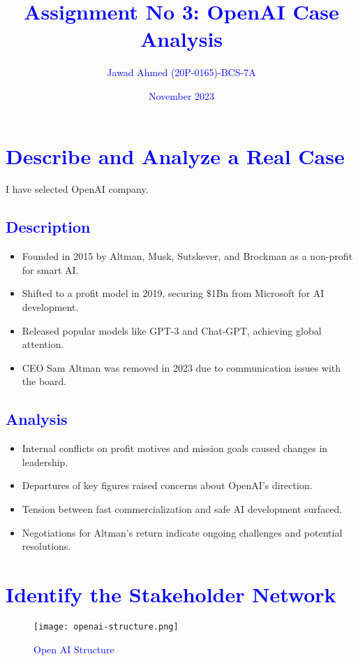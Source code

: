 \documentclass{article}
\title{\textcolor{blue}{\textbf{Assignment No 3: OpenAI Case Analysis}}}
\author{\textcolor{blue}{Jawad Ahmed (20P-0165)-BCS-7A}}
\date{\textcolor{blue}{November 2023}}
\begin{document}
\maketitle

\section{\textcolor{blue}{Describe and Analyze a Real Case}}
I have selected OpenAI company.

\subsection{\textcolor{blue}{Description}}
\begin{itemize}
    \item Founded in 2015 by Altman, Musk, Sutskever, and Brockman as a non-profit for smart AI.
    \item Shifted to a profit model in 2019, securing \$1Bn from Microsoft for AI development.
    \item Released popular models like GPT-3 and Chat-GPT, achieving global attention.
    \item CEO Sam Altman was removed in 2023 due to communication issues with the board.
\end{itemize}

\subsection{\textcolor{blue}{Analysis}}
\begin{itemize}
    \item Internal conflicts on profit motives and mission goals caused changes in leadership.
    \item Departures of key figures raised concerns about OpenAI's direction.
    \item Tension between fast commercialization and safe AI development surfaced.
    \item Negotiations for Altman's return indicate ongoing challenges and potential resolutions.
\end{itemize}

\section{\textcolor{blue}{Identify the Stakeholder Network}}
\begin{figure}[h]
    \centering
    \texttt{[image: openai-structure.png]} 
    \caption{\textcolor{blue}{Open AI Structure}}
    \label{fig:open-ai-structure}
\end{figure}
\end{document}
